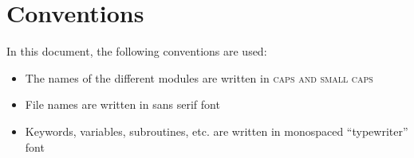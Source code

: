 \section*{Conventions}\label{sec:conventions}
In this document, the following conventions are used:
\begin{itemize}
\item The names of the different modules are written in {\scshape caps and small caps }
\item File names are written in {\sffamily sans serif font} 
\item Keywords, variables, subroutines, etc. are written in {\ttfamily monospaced ``typewriter'' font}
\end{itemize}

\pagebreak

\printnomenclature